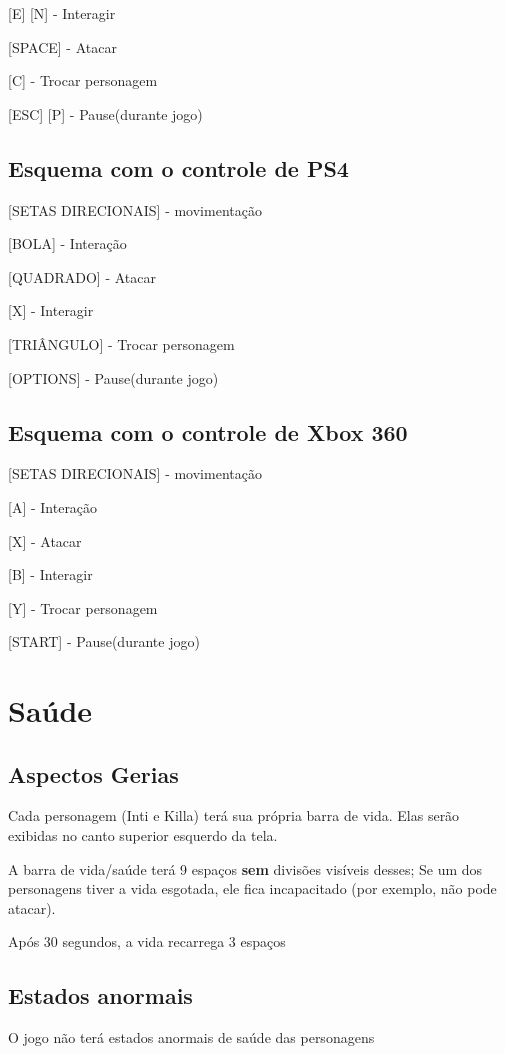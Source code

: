 \documentclass[12pt]{article}
\begin{document}
[E] [N] - Interagir

[SPACE] - Atacar

[C] - Trocar personagem

[ESC] [P] - Pause(durante jogo)

\subsection{Esquema com o controle de PS4}

[SETAS DIRECIONAIS] - movimentação

[BOLA] - Interação

[QUADRADO] - Atacar

[X] - Interagir

[TRIÂNGULO] - Trocar personagem

[OPTIONS] - Pause(durante jogo)

\subsection{Esquema com o controle de Xbox 360}

[SETAS DIRECIONAIS] - movimentação

[A] - Interação

[X] - Atacar

[B] - Interagir

[Y] - Trocar personagem

[START] - Pause(durante jogo)

\section{Saúde}

\subsection{Aspectos Gerias}
Cada personagem (Inti e Killa) terá sua própria barra de vida. Elas serão
exibidas no canto superior esquerdo da tela.


A barra de vida/saúde terá 9 espaços {\bf sem} divisões visíveis desses;
Se um dos personagens tiver a vida esgotada, ele fica incapacitado (por exemplo,
não pode atacar).


Após 30 segundos, a vida recarrega 3 espaços

\subsection{Estados anormais}
O jogo não terá estados anormais de saúde das personagens
\end{document}
